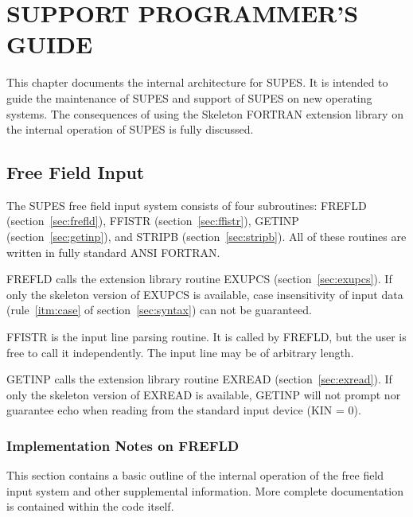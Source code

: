 \chapter{SUPPORT PROGRAMMER'S GUIDE} \label{sec:support}
This chapter documents the internal architecture for SUPES.  It is intended
to guide the maintenance of SUPES and support of SUPES on new operating
systems.  The consequences of using the Skeleton FORTRAN extension library
on the internal operation of SUPES is fully discussed.


\section{Free Field Input} The SUPES free field input system consists of
four subroutines: FREFLD (section~\ref{sec:frefld}),
FFISTR (section~\ref{sec:ffistr}), GETINP
(section~\ref{sec:getinp}), and STRIPB (section~\ref{sec:stripb}). All of
these routines are written in fully standard ANSI FORTRAN.

FREFLD calls the extension library routine EXUPCS
(section~\ref{sec:exupcs}). If only the skeleton version of EXUPCS is
available, case insensitivity of input data (rule~\ref{itm:case} of
section~\ref{sec:syntax}) can not be guaranteed.

FFISTR is the input line parsing routine.
It is called by FREFLD,
but the user is free to call it independently.
The input line may be of arbitrary length.

GETINP calls the extension library routine EXREAD
(section~\ref{sec:exread}). If only the skeleton version of EXREAD is
available, GETINP will not prompt nor guarantee echo when reading from the
standard input device (KIN = 0).


\subsection{Implementation Notes on FREFLD}

This section contains a basic outline of the internal operation of the free
field input system and other supplemental information.  More complete
documentation is contained within the code itself.

